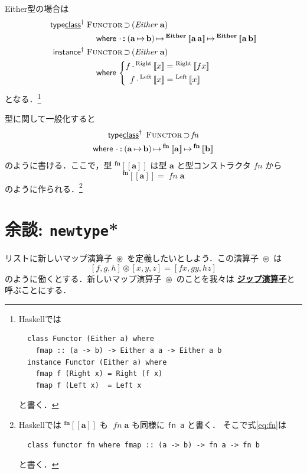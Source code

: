 \documentclass[a5paper,twoside,fleqn,draft]{jsbook}
\def\[{\left[\!\left[}
\def\]{\right]\!\right]}
\newcommand{\programminglanguage}[1]{\textsf{#1}}
\newcommand{\haskell}{\programminglanguage{Haskell}}
\newcommand{\keyword}[1]{{\underline{\textbf{#1}}}}
\newcommand{\code}[1]{\texttt{#1}}
\newcommand{\mKeyword}[1]{\mathsf{#1}} %
\newcommand{\mKeywordUnderline}[1]{\text{\underline{\textsf{#1}}}} %
\newcommand{\mInstanceKeyword}{\mKeyword{instance}}
\newcommand{\mTypeClassKeyword}{\mKeyword{type}\mKeywordUnderline{class}}
\newcommand{\mWhereKeyword}{\mKeyword{where}}
\DeclareMathOperator{\mInstanceParametric}{\mInstanceKeyword^{\dagger}}
\DeclareMathOperator{\mSuperSet}{\supset}
\DeclareMathOperator{\mTypeClassParametric}{\mTypeClassKeyword^\dagger}
\DeclareMathOperator{\mWhere}{\mWhereKeyword}
\DeclareMathOperator{\mIn}{{:\!:}}
\DeclareMathOperator{\mMap}{\cdot} %
\DeclareMathOperator{\mMapsTo}{\mapsto}
\DeclareMathOperator{\mZip}{\circledast}
\newcommand{\mSpecialSub}[1]{\text{#1}}
\newcommand{\mLeft}{\mSpecialSub{Left}}
\newcommand{\mRight}{\mSpecialSub{Right}}
\newcommand{\mType}[1]{\mathbf{#1}}
\newcommand{\mGenericTypeAssemble}[2]{{}^{\mType{#1}}\[\mType{#2}\]}
\newcommand{\mGenericTypeAssembleII}[3]{{}^{\mType{#1}}\[\mType{#2}\,\mType{#3}\]}
\newcommand{\mEitherType}[2]{\mGenericTypeAssembleII{Either}{#1}{#2}}
\newcommand{\mTypeConstructor}[1]{\textit{#1}}
\DeclareMathOperator{\mEitherTypeConstructor}{\mTypeConstructor{Either}}
\newcommand{\mValueConstructor}[1]{\mathrm{#1}}
\newcommand{\mGenericValueAssemble}[2]{{}^\mValueConstructor{#1}\[#2\]}
\newcommand{\mLeftWith}[1]{\mGenericValueAssemble{\mLeft}{#1}}
\newcommand{\mRightWith}[1]{\mGenericValueAssemble{\mRight}{#1}}
\newcommand{\mListWith}[1]{\left[#1\right]}
\newcommand{\mGenericTypeClass}[1]{\textsc{#1}} %
\newcommand{\mFunctorTypeClass}{\mGenericTypeClass{Functor}}
\newcommand{\mProj}[2]{#1\mMapsTo#2}
\begin{document}
Either型の場合は
\begin{align}
  \mTypeClassParametric\;
&\mFunctorTypeClass\mSuperSet{}(\mathop{\mEitherTypeConstructor}\,\mType{a})\nonumber\\
&\quad\mWhere{}\mMap\mIn{}\mProj{(\mProj{\mType{a}}{\mType{b}})}{\mProj{\mEitherType{a}{a}}{\mEitherType{a}{b}}}\\
  \mInstanceParametric\;
&\mFunctorTypeClass\mSuperSet{}(\mathop{\mEitherTypeConstructor}\,\mType{a})\nonumber\\
  &\quad\mWhere{}
  \left\{
  \begin{aligned}
    f\mMap{}\mRightWith{x}&=\mRightWith{fx}\\
    f\mMap{}\mLeftWith{x}&=\mLeftWith{x}
  \end{aligned}
  \right.
\end{align}
となる．\footnote{\haskell では
\begin{verbatim}
  class Functor (Either a) where
    fmap :: (a -> b) -> Either a a -> Either a b
  instance Functor (Either a) where
    fmap f (Right x) = Right (f x)
    fmap f (Left x)  = Left x
\end{verbatim}
と書く．}

型に関して一般化すると
\begin{multline}
  \label{eq:fn}
  \mTypeClassParametric\;\mFunctorTypeClass\mSuperSet\mTypeConstructor{fn}\\
  \mWhere{}
\mMap\mIn{}\mProj{(\mProj{\mType{a}}{\mType{b}})}{\mProj{\mGenericTypeAssemble{fn}{a}}{\mGenericTypeAssemble{fn}{b}}}
\end{multline}
のように書ける．ここで，型 $\mGenericTypeAssemble{fn}{a}$ は型
$\mType{a}$ と型コンストラクタ $\mTypeConstructor{fn}$ から
\begin{equation}
  \mGenericTypeAssemble{fn}{a}=\mathop{\mTypeConstructor{fn}}\mType{a}
\end{equation}
のように作られる．\footnote{\haskell では
  $\mGenericTypeAssemble{fn}{a}$ も
  $\mathop{\mTypeConstructor{fn}}\mType{a}$ も同様に \code{fn a} と書く．
  そこで式\eqref{eq:fn}は
\begin{verbatim}
  class functor fn where fmap :: (a -> b) -> fn a -> fn b
\end{verbatim}
と書く．}

\section{余談: \code{newtype}*}

リストに新しいマップ演算子 $\mZip$ を定義したいとしよう．この演算子
$\mZip$ は
\begin{equation}
\mListWith{f,g,h}\mZip\mListWith{x,y,z}=\mListWith{fx,gy,hz}
\end{equation}
のように働くとする．新しいマップ演算子 $\mZip$ のことを我々は
\keyword{ジップ演算子}と呼ぶことにする．
\end{document}
